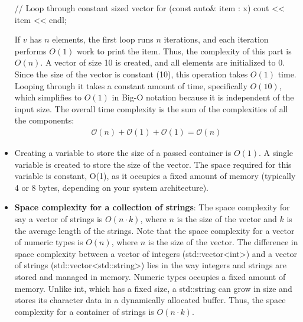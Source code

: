 \documentclass{report}
\begin{document}
\begin{itemize}
\begin{cppcode}
{                    // Loop through constant sized vector
                    for (const auto& item : x)  {
                        cout << item << endl;
                    }
                }
            \end{cppcode}
            \bigbreak \noindent 
            If $v$ has $n$ elements, the first loop runs $n$ iterations, and each iteration performs $O(1)$ work to print the item. Thus, the complexity of this part is $O(n)$.
            \bigbreak \noindent 
            A vector of size 10 is created, and all elements are initialized to 0. Since the size of the vector is constant (10), this operation takes $O(1)$ time.
            \bigbreak \noindent 
            Looping through it takes a constant amount of time, specifically $O(10)$, which simplifies to $O(1)$ in Big-O notation because it is independent of the input size.
            \bigbreak \noindent 
            The overall time complexity is the sum of the complexities of all the components:
            \begin{align*}
                \mathcal{O}(n) +\mathcal{O}(1) + \mathcal{O}(1) = \mathcal{O}(n)
            \end{align*}
        \item Creating a variable to store the size of a passed container  is $O(1)$. A single variable is created to store the size of the vector. The space required for this variable is constant, O(1), as it occupies a fixed amount of memory (typically 4 or 8 bytes, depending on your system architecture).
        \item \textbf{Space complexity for a collection of strings}: The space complexity for say a vector of strings is $O(n \cdot k)$, where $n$ is the size of the vector and $k$ is the average length of the strings.
            \bigbreak \noindent 
            Note that the space complexity for a vector of numeric types is $O(n)$, where $n$ is the size of the vector. The difference in space complexity between a vector of integers (std::vector<int>) and a vector of strings (std::vector<std::string>) lies in the way integers and strings are stored and managed in memory.
            \bigbreak \noindent 
            Numeric types occupies a fixed amount of memory. Unlike int, which has a fixed size, a std::string can grow in size and stores its character data in a dynamically allocated buffer. Thus, the space complexity for a container of strings is $O(n \cdot k)$. 
    \end{itemize}

    \bigbreak \noindent 
\end{document}
